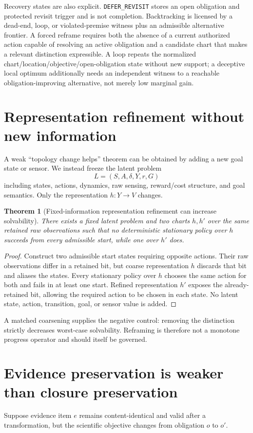 \documentclass[11pt]{article}
\newtheorem{theorem}{Theorem}
\begin{document}
Recovery states are also explicit. \texttt{DEFER\_REVISIT} stores an open
obligation and protected revisit trigger and is not completion. Backtracking is
licensed by a dead-end, loop, or violated-premise witness plus an admissible
alternative frontier. A forced reframe requires both the absence of a current
authorized action capable of resolving an active obligation and a candidate
chart that makes a relevant distinction expressible. A loop repeats the
normalized chart/location/objective/open-obligation state without new support;
a deceptive local optimum additionally needs an independent witness to a
reachable obligation-improving alternative, not merely low marginal gain.

\section{Representation refinement without new information}
A weak ``topology change helps'' theorem can be obtained by adding a new goal state or sensor. We instead freeze the latent problem
\[
L=(S,A,\delta,Y,r,G)
\]
including states, actions, dynamics, raw sensing, reward/cost structure, and goal semantics. Only the representation $h:Y\to V$ changes.

\begin{theorem}[Fixed-information representation refinement can increase solvability]
There exists a fixed latent problem and two charts $h,h'$ over the same retained raw observations such that no deterministic stationary policy over $h$ succeeds from every admissible start, while one over $h'$ does.
\end{theorem}
\begin{proof}
Construct two admissible start states requiring opposite actions. Their raw observations differ in a retained bit, but coarse representation $h$ discards that bit and aliases the states. Every stationary policy over $h$ chooses the same action for both and fails in at least one start. Refined representation $h'$ exposes the already-retained bit, allowing the required action to be chosen in each state. No latent state, action, transition, goal, or sensor value is added.
\end{proof}

A matched coarsening supplies the negative control: removing the distinction strictly decreases worst-case solvability. Reframing is therefore not a monotone progress operator and should itself be governed.

\section{Evidence preservation is weaker than closure preservation}
Suppose evidence item $e$ remains content-identical and valid after a transformation, but the scientific objective changes from obligation $o$ to $o'$.
\end{document}
